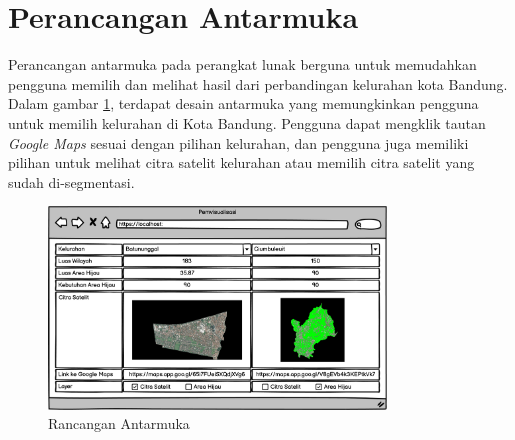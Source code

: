 \section{Perancangan Antarmuka}
\label{sec:antarmuka}
Perancangan antarmuka pada perangkat lunak berguna untuk memudahkan pengguna memilih dan melihat hasil dari perbandingan kelurahan kota Bandung. Dalam gambar \ref{fig:rancanganAntarmuka}, terdapat desain antarmuka yang memungkinkan pengguna untuk memilih kelurahan di Kota Bandung. Pengguna dapat mengklik tautan \textit{Google Maps} sesuai dengan pilihan kelurahan, dan pengguna juga memiliki pilihan untuk melihat citra satelit kelurahan atau memilih citra satelit yang sudah di-segmentasi.

\begin{figure}[H]
	\centering
	\includegraphics[width=0.8\textwidth]{Gambar/perancangan.png}
	\caption{Rancangan Antarmuka}
	\label{fig:rancanganAntarmuka}
\end{figure} 